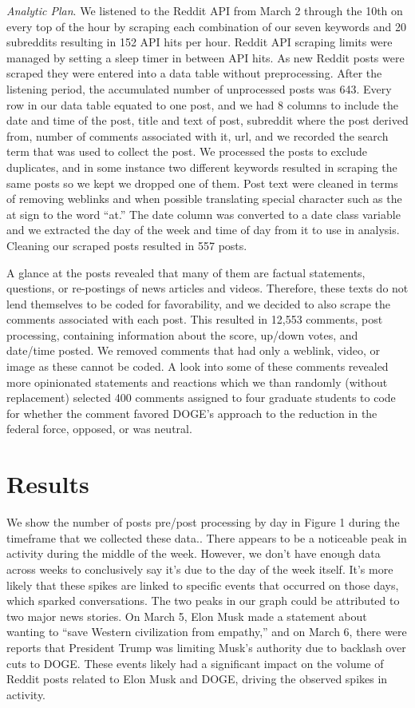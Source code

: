\documentclass[
  12pt]{article}
\begin{document}
\emph{Analytic Plan}. We listened to the Reddit API from March 2 through
the 10th on every top of the hour by scraping each combination of our
seven keywords and 20 subreddits resulting in 152 API hits per hour.
Reddit API scraping limits were managed by setting a sleep timer in
between API hits. As new Reddit posts were scraped they were entered
into a data table without preprocessing. After the listening period, the
accumulated number of unprocessed posts was 643. Every row in our data
table equated to one post, and we had 8 columns to include the date and
time of the post, title and text of post, subreddit where the post
derived from, number of comments associated with it, url, and we
recorded the search term that was used to collect the post. We processed
the posts to exclude duplicates, and in some instance two different
keywords resulted in scraping the same posts so we kept we dropped one
of them. Post text were cleaned in terms of removing weblinks and when
possible translating special character such as the at sign to the word
``at.'' The date column was converted to a date class variable and we
extracted the day of the week and time of day from it to use in
analysis. Cleaning our scraped posts resulted in 557 posts.

A glance at the posts revealed that many of them are factual statements,
questions, or re-postings of news articles and videos. Therefore, these
texts do not lend themselves to be coded for favorability, and we
decided to also scrape the comments associated with each post. This
resulted in 12,553 comments, post processing, containing information
about the score, up/down votes, and date/time posted. We removed
comments that had only a weblink, video, or image as these cannot be
coded. A look into some of these comments revealed more opinionated
statements and reactions which we than randomly (without replacement)
selected 400 comments assigned to four graduate students to code for
whether the comment favored DOGE's approach to the reduction in the
federal force, opposed, or was neutral.

\section{Results}\label{results}

We show the number of posts pre/post processing by day in Figure 1
during the timeframe that we collected these data.. There appears to be
a noticeable peak in activity during the middle of the week. However, we
don't have enough data across weeks to conclusively say it's due to the
day of the week itself. It's more likely that these spikes are linked to
specific events that occurred on those days, which sparked
conversations. The two peaks in our graph could be attributed to two
major news stories. On March 5, Elon Musk made a statement about wanting
to ``save Western civilization from empathy,'' and on March 6, there
were reports that President Trump was limiting Musk's authority due to
backlash over cuts to DOGE. These events likely had a significant impact
on the volume of Reddit posts related to Elon Musk and DOGE, driving the
observed spikes in activity.
\end{document}

